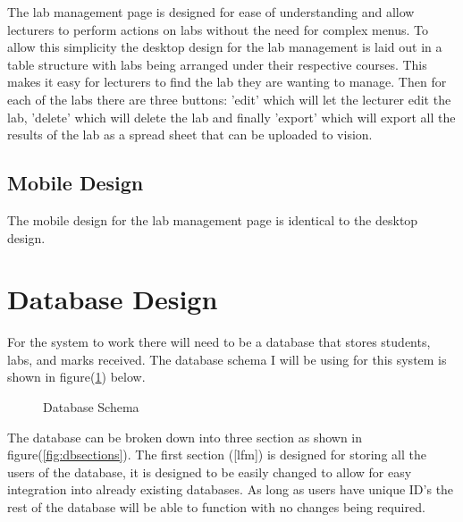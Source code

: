 \documentclass[11pt]{report}
\begin{document}
The lab management page is designed for ease of understanding and allow lecturers to perform actions on labs without the need for complex menus. To allow this simplicity the desktop design for the lab management is laid out in a table structure with labs being arranged under their respective courses. This makes it easy for lecturers to find the lab they are wanting to manage. Then for each of the labs there are three buttons: 'edit' which will let the lecturer edit the lab, 'delete' which will delete the lab and finally 'export' which will export all the results of the lab as a spread sheet that can be uploaded to vision.

\subsection*{Mobile Design}

The mobile design for the lab management page is identical to the desktop design.




\section{Database Design}
\label{sec:design-db}
For the system to work there will need to be a database that stores students, labs, and marks received. The database schema I will be using for this system is shown in figure(\ref{fig:dbschema}) below.

\begin{figure}[H]
	\caption{Database Schema}
	\label{fig:dbschema}
\end{figure}

\noindent The database can be broken down into three section as shown in figure(\ref{fig:dbsections}). The first section ([lfm]) is designed for storing all the users of the database, it is designed to be easily changed to allow for easy integration into already existing databases. As long as users have unique ID's the rest of the database will be able to function with no changes being required.
\end{document}
